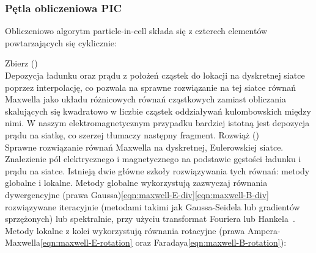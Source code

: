     \subsubsection{Pętla obliczeniowa PIC}
    Obliczeniowo algorytm particle-in-cell składa się z czterech elementów
    powtarzających się cyklicznie:
    \begin{itemize}
        \itemi{} Zbierz ()\\
    Depozycja ładunku oraz prądu z położeń cząstek do lokacji na dyskretnej
    siatce poprzez interpolację, co pozwala na sprawne rozwiązanie na tej
    siatce równań Maxwella jako układu różnicowych równań cząstkowych zamiast
    obliczania skalujących się kwadratowo w liczbie cząstek oddziaływań
    kulombowskich między nimi.  W naszym elektromagnetycznym przypadku bardziej
    istotną jest depozycja prądu na siatkę, co szerzej tłumaczy następny
    fragment.
    \itemi{} Rozwiąż ()\\
    Sprawne rozwiązanie równań Maxwella na dyskretnej, Eulerowskiej siatce.
    Znalezienie pól elektrycznego i magnetycznego na podstawie gęstości ładunku
    i prądu na siatce.  Istnieją dwie główne szkoły rozwiązywania tych równań:
    metody globalne i lokalne. Metody globalne wykorzystują zazwyczaj równania
    dywergencyjne (prawa Gaussa)\ref{eqn:maxwell-E-div}\ref{eqn:maxwell-B-div}
    rozwiązywane iteracyjnie (metodami takimi jak Gaussa-Seidela lub gradientów
    sprzężonych)
     lub spektralnie, przy użyciu transformat Fouriera lub Hankela~\cite{fbpic}.
     Metody lokalne z kolei
    wykorzystują równania rotacyjne (prawa Ampera-Maxwella\ref{eqn:maxwell-E-rotation}
    oraz Faradaya\ref{eqn:maxwell-B-rotation}):


\end{itemize}

